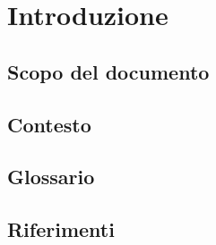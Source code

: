 \section{Introduzione}
    \subsection{Scopo del documento}
        

    \subsection{Contesto}
        
    \subsection{Glossario}
        
    \subsection{Riferimenti}